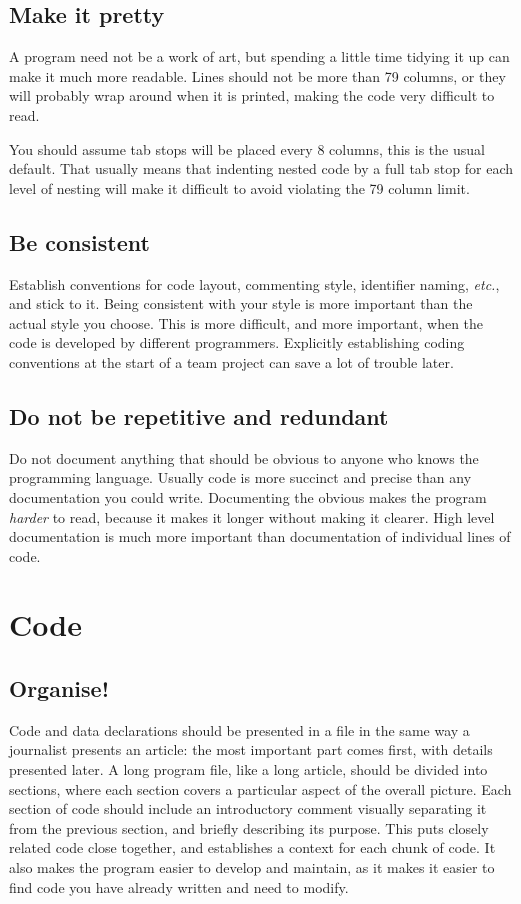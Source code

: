 \documentclass[a4paper]{article}
\begin{document}
\subsection{Make it pretty}
A program need not be a work of art, but spending a little time tidying it up
can make it much more readable.  Lines should not be more than 79 columns, or
they will probably wrap around when it is printed, making the code very
difficult to read.

You should assume tab stops will be placed every 8 columns, this is the usual
default.  That usually means that indenting nested code by a full tab stop
for each level of nesting will make it difficult to avoid violating the 79
column limit.


\subsection{Be consistent}
Establish conventions for code layout, commenting style, identifier naming,
\textit{etc.}, and stick to it.  Being consistent with your style is more
important than the actual style you choose.  This is more difficult, and more
important, when the code is developed by different programmers.  Explicitly
establishing coding conventions at the start of a team project can save a lot
of trouble later.

\subsection{Do not be repetitive and redundant}
Do not document anything that should be obvious to anyone who knows the
programming language.  Usually code is more succinct and
precise than any documentation you could write.  Documenting the obvious
makes the program \emph{harder} to read, because it makes it longer without
making it clearer.  High level documentation is much more important than
documentation of individual lines of code.

\section{Code}

\subsection{Organise!}
Code and data declarations should be presented in a file in the same way a
journalist presents an article:  the most important part comes first, with
details presented later.  A long program file, like a long article, should be
divided into sections, where each section covers a particular aspect of the
overall picture.  Each section of code should include an introductory comment
visually separating it from the previous section, and briefly describing its
purpose.  This puts closely related code close together, and establishes a
context for each chunk of code.  It also makes the program easier to develop
and maintain, as it makes it easier to find code you have already written and
need to modify.
\end{document}
